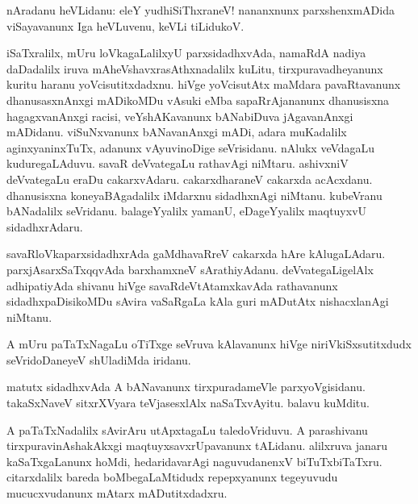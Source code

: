 \documentclass{article}
\begin{document}

\begin{mn}
nAradanu heVLidanu: eleY yudhiSiThxraneV! nananxnunx
parxshenxmADida viSayavanunx Iga heVLuvenu, keVLi tiLidukoV.
\end{mn}

\begin{mn}
iSaTxralilx, mUru loVkagaLalilxyU parxsidadhxvAda, namaRdA nadiya daDadalilx iruva 
mAheVshavxrasAthxnadalilx kuLitu, tirxpuravadheyanunx kuritu haranu yoVcisutitxdadxnu.
hiVge yoVcisutAtx maMdara pavaRtavanunx dhanusasxnAnxgi mADikoMDu vAsuki eMba sapaRrAjananunx 
dhanusisxna hagagxvanAnxgi racisi, veYshAKavanunx bANabiDuva jAgavanAnxgi mADidanu. viSuNxvanunx
bANavanAnxgi mADi, adara muKadalilx aginxyaninxTuTx, adanunx vAyuvinoDige seVrisidanu. nAlukx 
veVdagaLu kuduregaLAduvu. savaR deVvategaLu rathavAgi niMtaru. ashivxniV deVvategaLu eraDu 
cakarxvAdaru. cakarxdharaneV cakarxda acAcxdanu. dhanusisxna koneyaBAgadalilx iMdarxnu 
sidadhxnAgi niMtanu.  kubeVranu bANadalilx seVridanu. balageYyalilx yamanU, eDageYyalilx maqtuyxvU 
sidadhxrAdaru.
\end{mn}

\begin{mn}
savaRloVkaparxsidadhxrAda gaMdhavaRreV cakarxda hAre kAlugaLAdaru. parxjAsarxSaTxqqvAda 
barxhamxneV sArathiyAdanu. deVvategaLigelAlx adhipatiyAda shivanu hiVge savaRdeVtAtamxkavAda
rathavanunx sidadhxpaDisikoMDu sAvira vaSaRgaLa kAla guri mADutAtx nishacxlanAgi niMtanu.
\end{mn}

\begin{mn}
A mUru paTaTxNagaLu oTiTxge seVruva kAlavanunx hiVge niriVkiSxsutitxdudx seVridoDaneyeV 
shUladiMda iridanu.
\end{mn}

\begin{mn}
matutx sidadhxvAda A bANavanunx tirxpuradameVle parxyoVgisidanu. takaSxNaveV sitxrXVyara 
teVjasesxlAlx naSaTxvAyitu. balavu kuMditu.
\end{mn}

\begin{mn}
A paTaTxNadalilx sAvirAru utApxtagaLu taledoVriduvu. A parashivanu tirxpuravinAshakAkxgi 
maqtuyxsavxrUpavanunx tALidanu. alilxruva janaru kaSaTxgaLanunx hoMdi, hedaridavarAgi naguvudanenxV
biTuTxbiTaTxru. citarxdalilx bareda boMbegaLaMtidudx repepxyanunx tegeyuvudu mucucxvudanunx mAtarx 
mADutitxdadxru.
\end{mn}
\end{document}
